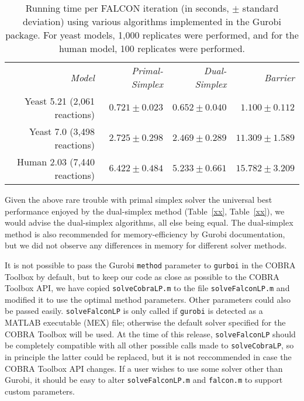 \begin{table}
\begin{center}
\begin{tabular}{rrrr}
\emph{Model}                 & \emph{Primal-Simplex} & \emph{Dual-Simplex} & \emph{Barrier} \\
Yeast 5.21 (2,061 reactions) & $ 0.721 \pm 0.023 $ & $ 0.652 \pm 0.040 $ & $ 1.100 \pm 0.112  $\\ 
Yeast 7.0 (3,498 reactions)  & $ 2.725 \pm 0.298 $ & $ 2.469 \pm 0.289 $ & $ 11.309 \pm 1.589 $\\
Human 2.03 (7,440 reactions) & $ 6.422 \pm 0.484 $ & $ 5.233 \pm 0.661 $ & $ 15.782 \pm 3.209 $\\ 
\end{tabular}
\end{center}
\caption{Running time per FALCON iteration (in seconds, $\pm$ standard
  deviation) using various algorithms implemented in the Gurobi
  package.  For yeast models, 1,000 replicates were performed, and for
  the human model, 100 replicates were performed.}
\label{tab:methodTimeIter}
\end{table}

Given the above rare trouble with primal simplex solver the universal
best performance enjoyed by the dual-simplex method (Table~\ref{xx},
Table~\ref{xx}), we would advise the dual-simplex algorithms, all else
being equal. The dual-simplex method is also recommended for
memory-efficiency by Gurobi documentation, but we did not observe any
differences in memory for different solver methods.

It is not possible to pass the Gurobi \texttt{method} parameter to
\texttt{gurboi} in the COBRA Toolbox by default, but to keep our code
as close as possible to the COBRA Toolbox API, we have copied
\texttt{solveCobraLP.m} to the file \texttt{solveFalconLP.m} and
modified it to use the optimal method parameters. Other parameters
could also be passed easily. \texttt{solveFalconLP} is only called if
\texttt{gurobi} is detected as a MATLAB executable (MEX) file;
otherwise the default solver specified for the COBRA Toolbox will be
used. At the time of this release, \texttt{solveFalconLP} should be
completely compatible with all other possible calls made to
\texttt{solveCobraLP}, so in principle the latter could be replaced,
but it is not reccommended in case the COBRA Toolbox API changes. If a
user wishes to use some solver other than Gurobi, it should be easy to
alter \texttt{solveFalconLP.m} and \texttt{falcon.m} to support custom
parameters. 

